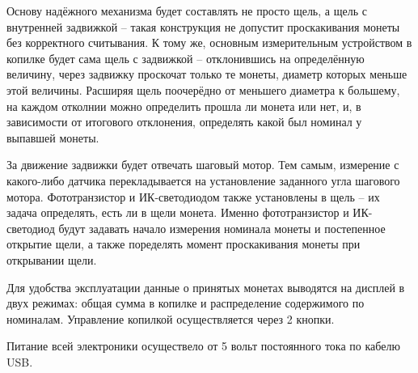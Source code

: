 Основу надёжного механизма будет составлять не просто щель, а щель с внутренней задвижкой -- такая конструкция не допустит проскакивания монеты без корректного считывания. К тому же, основным измерительным устройством в копилке будет сама щель с задвижкой -- отклонившись на определённую величину, через задвижку проскочат только те монеты, диаметр которых меньше этой величины. Расширяя щель поочерёдно от меньшего диаметра к большему, на каждом отколнии можно определить прошла ли монета или нет, и, в зависимости от итогового отклонения, определять какой был номинал у выпавшей монеты.
\par\medskip

За движение задвижки будет отвечать шаговый мотор. Тем самым, измерение с какого-либо датчика перекладывается на установление заданного угла шагового мотора. Фототранзистор и ИК-светодиодом также установлены в щель -- их задача определять, есть ли в щели монета. Именно фототранзистор и ИК-светодиод будут задавать начало измерения номинала монеты и постепенное открытие щели, а также поределять момент проскакивания монеты при открывании щели.
\par\medskip

Для удобства эксплуатации данные о принятых монетах выводятся на дисплей в двух режимах: общая сумма в копилке и распределение содержимого по номиналам. Управление копилкой осуществляется через 2 кнопки.
\par\medskip

Питание всей электроники осуществело от 5 вольт постоянного тока по кабелю USB.